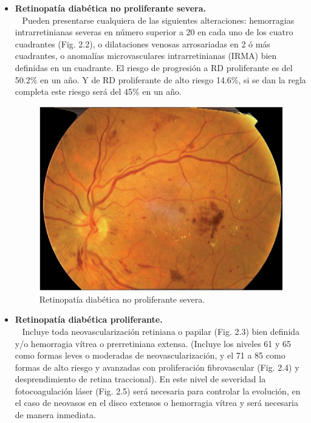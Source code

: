 \documentclass[12pt,letterpaper]{report}
\begin{document}
\begin{itemize}
\medskip
\item \textbf{Retinopatía diabética no proliferante severa.}\\\
\linebreak
Pueden presentarse cualquiera de las siguientes alteraciones: hemorragias intrarretinianas severas en número superior a 20 en cada uno de los cuatro cuadrantes (Fig. 2.2), o dilataciones venosas arrosariadas en 2 ó más cuadrantes, o anomalías microvasculares intrarretinianas (IRMA) bien definidas en un cuadrante. El riesgo de progresión a RD proliferante es del 50.2\% en un año. Y de RD proliferante de alto riesgo 14.6\%, si se dan la regla completa este riesgo será del 45\% en un año.
\linebreak

\begin{figure}[!htb]
    \centering
    \includegraphics[width=.75\textwidth]{Img_C2_2.1/FIG_2.png}  
    \caption{Retinopatía diabética no proliferante severa.}
    \label{fig:fig2}
\end{figure}

\pagebreak
\item \textbf{Retinopatía diabética proliferante.}\\\
\linebreak
Incluye toda neovascularización retiniana o papilar (Fig. 2.3) bien definida y/o hemorragia vítrea o prerretiniana extensa. (Incluye los niveles 61 y 65 como formas leves o moderadas de neovascularización, y el 71 a 85 como formas de alto riesgo y avanzadas con proliferación fibrovascular (Fig. 2.4) y desprendimiento de retina traccional). En este nivel de severidad la fotocoagulación láser (Fig. 2.5) será necesaria para controlar la evolución, en el caso de neovasos en el disco extensos o hemorragia vítrea y será necesaria de manera inmediata.
\medskip
\linebreak


\end{itemize}
\end{document}
